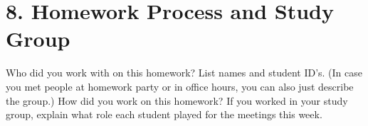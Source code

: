 \documentclass[11pt]{article}
\begin{document}
\newpage

\section*{8. Homework Process and Study Group}

Who did you work with on this homework? List names and student ID’s. (In case you met people at homework party or in office hours, you can also just describe the group.) How did you work on this homework? If you worked in your study group, explain what role each student played for the meetings this week.

\begin{Answer}
    
\end{Answer}

\newpage
\end{document}
